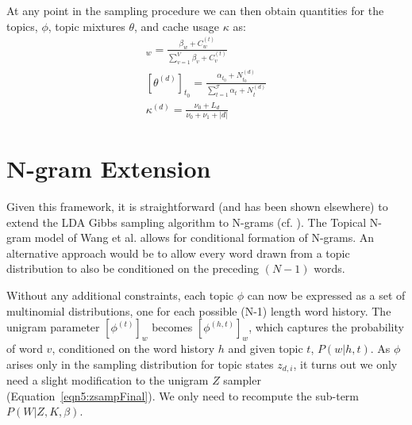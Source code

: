 At any point in the sampling procedure we can then obtain quantities for the topics, $\phi$, topic mixtures $\theta$, and cache usage $\kappa$ as:
\begin{align}
[\phi^{(t)}]_{w} = \frac{\beta_w + C^{(t)}_{w}}{\sum_{v=1}^V \beta_v + C^{(t)}_v} \\
[\theta^{(d)}]_{t_0} = \frac{\alpha_{t_0} + N^{(d)}_{t_0}}{\sum_{t=1}^\mathcal{T} \alpha_t + N^{(d)}_t} \\
\kappa^{(d)} = \frac{\nu_0 + L_d}{\nu_0 + \nu_1 + |d|} 
\end{align}

\section{N-gram Extension}
Given this framework, it is straightforward (and has been shown elsewhere) to extend the LDA Gibbs sampling algorithm to N-grams (cf. \cite{wang2007topical}). The Topical N-gram model of Wang et al. allows for conditional formation of N-grams.  An alternative approach would be to allow every word drawn from a topic distribution to also be conditioned on the preceding $(N-1)$ words.

Without any additional constraints, each topic $\phi$ can now be expressed as a set of multinomial distributions, one for each possible (N-1) length word history.   The unigram parameter $[\phi^{(t)}]_w$ becomes $[\phi^{(h,t)}]_w$, which captures the probability of word $v$, conditioned on the word history $h$ and given topic $t$, $P(w|h,t)$.  As $\phi$ arises only in the sampling distribution for topic states $z_{d,i}$, it turns out we only need a slight modification to the unigram $Z$ sampler (Equation~\ref{eqn5:zsampFinal}).  We only need to recompute the sub-term $P(W|Z,K,\beta)$.   

